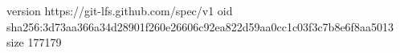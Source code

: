 version https://git-lfs.github.com/spec/v1
oid sha256:3d73aa366a34d28901f260e26606c92ea822d59aa0cc1c03f3c7b8e6f8aa5013
size 177179
